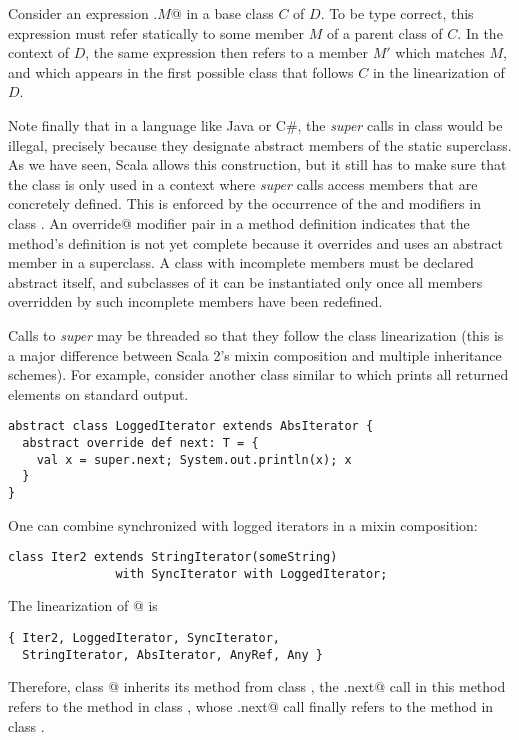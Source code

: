 \documentclass[a4paper,11pt,twoside]{article}
\begin{document}
\begin{definition}
Consider an expression \lstinline@super.$M$@ in a base class $C$ of
$D$.  To be type correct, this expression must refer statically to
some member $M$ of a parent class of $C$. In the context of $D$, the
same expression then refers to a member $M'$ which matches $M$, and
which appears in the first possible class that follows $C$ in the
linearization of $D$.
\end{definition}
Note finally that in a language like Java or C\#, the
{\em super} calls in class \lstinline@SyncIterator@ would be
illegal, precisely because they designate abstract members of the
static superclass. As we have seen, Scala allows this construction,
but it still has to make sure that the class is only used in a context
where {\em super} calls access members that are concretely
defined. This is enforced by the occurrence of the
\lstinline@abstract@ and
\lstinline@override@ modifiers in class \lstinline@SyncIterator@. An
\lstinline@abstract override@ modifier pair in a method definition
indicates that the method's definition is not yet complete because it
overrides and uses an abstract member in a superclass. A class with
incomplete members must be declared abstract itself, and subclasses of
it can be instantiated only once all members overridden by such
incomplete members have been redefined.

Calls to {\em super} may be threaded so that they follow the class
linearization (this is a major difference between Scala 2's mixin
composition and multiple inheritance schemes). For example, consider
another class similar to \lstinline@SyncIterator@ which prints all
returned elements on standard output.
\begin{lstlisting}
abstract class LoggedIterator extends AbsIterator {
  abstract override def next: T = { 
    val x = super.next; System.out.println(x); x 
  }
}
\end{lstlisting}
One can combine synchronized with logged iterators in a mixin
composition:\medskip

\begin{lstlisting}
class Iter2 extends StringIterator(someString) 
               with SyncIterator with LoggedIterator;         
\end{lstlisting}
The linearization of @ is
\begin{lstlisting}
{ Iter2, LoggedIterator, SyncIterator, 
  StringIterator, AbsIterator, AnyRef, Any }
\end{lstlisting}
Therefore, class @ inherits 
its \lstinline@next@ method from class \lstinline@LoggedIterator@,
the \lstinline@super.next@ call in this method refers
to the \lstinline@next@ method in class \lstinline@SyncIterator@, whose  
\lstinline@super.next@ call finally refers to the
\lstinline@next@ method in class \lstinline@StringIterator@.
\end{document}
